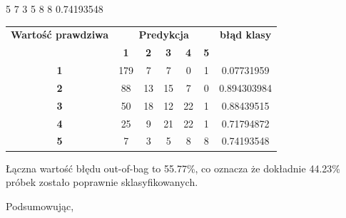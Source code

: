  5   7  3  5  8 8  0.74193548
 \begin{table}[h!]
\begin{tabular}{|c|c|c|c|c|c|c|}
\hline
\multirow{}{}{\textbf{Wartość  prawdziwa}} & \multicolumn{5}{c|}{\textbf{ Predykcja}}                                & \multirow{}{}{\textbf{błąd klasy}} \\ \cline{2-6}
                            & \textbf{1} & \textbf{2} & \textbf{3} & \textbf{4} & \textbf{5} &                                      \\ \hline
\textbf{1}                  & 179        & 7          & 7          & 0          & 1          & 0.07731959                           \\ \hline
\textbf{2}                  & 88         & 13         & 15         & 7          & 0          & 0.894303984                          \\ \hline
\textbf{3}                  & 50         & 18         & 12         & 22         & 1          & 0.88439515                           \\ \hline
\textbf{4}                  & 25         & 9          & 21         & 22         & 1          & 0.71794872                           \\ \hline
\textbf{5}                  & 7          & 3          & 5          & 8          & 8          & 0.74193548                           \\ \hline
\end{tabular}
\end{table}
Łączna wartość błędu out-of-bag to 55.77\%, co oznacza że dokładnie 44.23\% próbek zostało poprawnie sklasyfikowanych. 



Podsumowując, 




